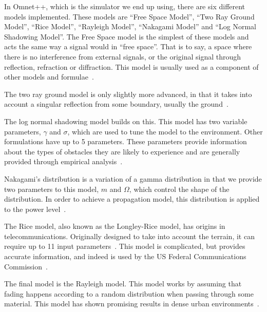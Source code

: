     In Omnet++, which is the simulator we end up using, there are six different models implemented. These models are ``Free Space Model'', ``Two Ray Ground Model'', ``Rice Model'', ``Rayleigh Model'', ``Nakagami Model'' and ``Log Normal Shadowing Model''. The Free Space model is the simplest of these models and acts the same way a signal would in ``free space''. That is to say, a space where there is no interference from external signals, or the original signal through reflection, refraction or diffraction. This model is usually used as a component of other models and formulae~\cite{friis1946note}.

    The two ray ground model is only slightly more advanced, in that it takes into account a singular reflection from some boundary, usually the ground~\cite{tworaygroundmodel}.

    The log normal shadowing model builds on this. This model has two variable parameters, $\gamma$ and $\sigma$, which are used to tune the model to the environment. Other formulations have up to 5 parameters. These parameters provide information about the types of obstacles they are likely to experience and are generally provided through empirical analysis~\cite{goldhirsh1998handbook}.

    Nakagami's distribution is a variation of a gamma distribution in that we provide two parameters to this model, $m$ and $\Omega$, which control the shape of the distribution. In order to achieve a propagation model, this distribution is applied to the power level~\cite{nakagamipowerlevel}.

    The Rice model, also known as the Longley-Rice model, has origins in telecommunications. Originally designed to take into account the terrain, it can require up to 11 input parameters~\cite{ricemodel}. This model is complicated, but provides accurate information, and indeed is used by the US Federal Communications Commission~\cite{fcclongleyrice}.

    The final model is the Rayleigh model. This model works by assuming that fading happens according to a random distribution when passing through some material. This model has shown promising results in dense urban environments~\cite{rayleighmanhattan}.



